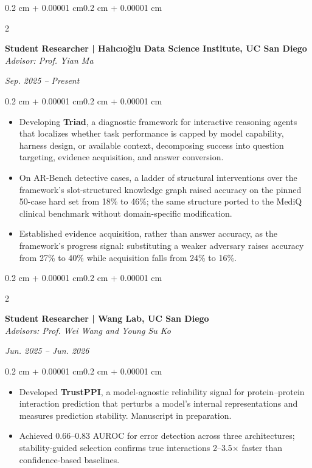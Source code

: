 \documentclass[10pt, letterpaper]{article}
\newenvironment{highlights}{
    \begin{itemize}[
        topsep=0.10 cm,
        parsep=0.10 cm,
        partopsep=0pt,
        itemsep=0pt,
        leftmargin=0.4 cm + 10pt
    ]
}{\end{itemize}}
\newenvironment{onecolentry}{
    \begin{adjustwidth}{0.2 cm + 0.00001 cm}{0.2 cm + 0.00001 cm}
}{\end{adjustwidth}}
\newenvironment{twocolentry}[2][]{
    \onecolentry
    \def\secondColumn{#2}
    \setcolumnwidth{\fill, 4.5 cm}
    \begin{paracol}{2}
}{
    \switchcolumn \raggedleft \secondColumn
    \end{paracol}
    \endonecolentry
}
\begin{document}
    \begin{twocolentry}{\textit{Sep. 2025 -- Present}}
        \textbf{Student Researcher | Halıcıo\u{g}lu Data Science Institute, UC San Diego}\\
        \textit{Advisor: Prof. Yian Ma}
    \end{twocolentry}
    \vspace{0.10 cm}
    \begin{onecolentry}
        \begin{highlights}
            \item Developing \textbf{Triad}, a diagnostic framework for interactive reasoning agents that localizes whether task performance is capped by model capability, harness design, or available context, decomposing success into question targeting, evidence acquisition, and answer conversion.
            \item On AR-Bench detective cases, a ladder of structural interventions over the framework's slot-structured knowledge graph raised accuracy on the pinned 50-case hard set from 18\% to 46\%; the same structure ported to the MediQ clinical benchmark without domain-specific modification.
            \item Established evidence acquisition, rather than answer accuracy, as the framework's progress signal: substituting a weaker adversary raises accuracy from 27\% to 40\% while acquisition falls from 24\% to 16\%.
        \end{highlights}
    \end{onecolentry}
    \vspace{0.20 cm}

    \begin{twocolentry}{\textit{Jun. 2025 -- Jun. 2026}}
        \textbf{Student Researcher | Wang Lab, UC San Diego}\\
        \textit{Advisors: Prof. Wei Wang and Young Su Ko}
    \end{twocolentry}
    \vspace{0.10 cm}
    \begin{onecolentry}
        \begin{highlights}
            \item Developed \textbf{TrustPPI}, a model-agnostic reliability signal for protein--protein interaction prediction that perturbs a model's internal representations and measures prediction stability. Manuscript in preparation.
            \item Achieved 0.66--0.83 AUROC for error detection across three architectures; stability-guided selection confirms true interactions 2--3.5$\times$ faster than confidence-based baselines.
        \end{highlights}
    \end{onecolentry}
\end{document}
